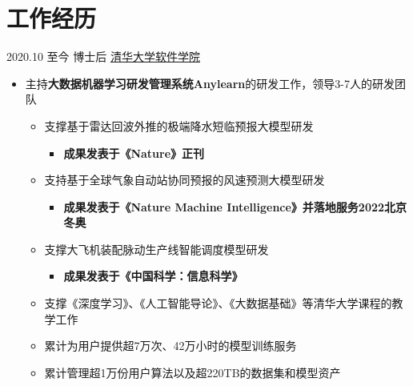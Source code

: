 \documentclass[letterpaper]{twentysecondcv} %
\begin{document}
\vspace{-0.6cm}
\section{工作经历}

\begin{twentyfluid}

\twentyitemfluid
    {2020.10 至今}
    {博士后}
    {\href{https://www.thss.tsinghua.edu.cn/index.htm}{清华大学软件学院}}
    {\\     }
    {
    {
    \vspace{-0.2cm}
    \begin{itemize}
        \item 主持\textbf{大数据机器学习研发管理系统Anylearn}的研发工作，领导3-7人的研发团队
        \begin{itemize}
            \item 支撑基于雷达回波外推的极端降水短临预报大模型研发
            \begin{itemize}
                \item \textbf{成果发表于《Nature》正刊}
            \end{itemize}
            \item 支持基于全球气象自动站协同预报的风速预测大模型研发
            \begin{itemize}
                \item \textbf{成果发表于《Nature Machine Intelligence》并落地服务2022北京冬奥}
            \end{itemize}
            \item 支撑大飞机装配脉动生产线智能调度模型研发
            \begin{itemize}
                \item \textbf{成果发表于《中国科学：信息科学》}
            \end{itemize}
            \item 支撑《深度学习》、《人工智能导论》、《大数据基础》等清华大学课程的教学工作
            \item 累计为用户提供超7万次、42万小时的模型训练服务
            \item 累计管理超1万份用户算法以及超220TB的数据集和模型资产
        \end{itemize}

\end{itemize}}}
\end{twentyfluid}
\end{document}
